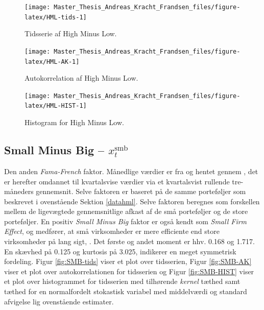 \documentclass[
  a4paper,
  oneside]{memoir}
\begin{document}
\begin{figure}[H]

{\centering \texttt{[image: Master\_Thesis\_Andreas\_Kracht\_Frandsen\_files/figure-latex/HML-tids-1]} 

}

\caption{Tidsserie af High Minus Low.}\label{fig:HML-tids}
\end{figure}

\begin{figure}[H]

{\centering \texttt{[image: Master\_Thesis\_Andreas\_Kracht\_Frandsen\_files/figure-latex/HML-AK-1]} 

}

\caption{Autokorrelation af High Minus Low.}\label{fig:HML-AK}
\end{figure}

\begin{figure}[H]

{\centering \texttt{[image: Master\_Thesis\_Andreas\_Kracht\_Frandsen\_files/figure-latex/HML-HIST-1]} 

}

\caption{Histogram for High Minus Low.}\label{fig:HML-HIST}
\end{figure}

\hypertarget{datasmb}{%
\subsection{\texorpdfstring{Small Minus Big -- \(x_t^{\text{smb}}\)}{Small Minus Big -- x\_t\^{}\{\textbackslash text\{smb\}\}}}\label{datasmb}}

Den anden \emph{Fama-French} faktor. Månedlige værdier er fra \citep{CRSPakt} og hentet gennem \citep{French2020}, det er herefter omdannet til kvartalsvise værdier via et kvartalsvist rullende tre-måneders gennemsnit. Selve faktoren er baseret på de samme porteføljer som beskrevet i ovenstående Sektion \ref{datahml}. Selve faktoren beregnes som forskellen mellem de ligevægtede gennemsnitlige afkast af de små porteføljer og de store porteføljer. En positiv \emph{Small Minus Big} faktor er også kendt som \emph{Small Firm Effect}, og medfører, at små virksomheder er mere efficiente end store virksomheder på lang sigt, \citep{French1993}. Det første og andet moment er hhv. 0.168 og 1.717. En skævhed på 0.125 og kurtosis på 3.025, indikerer en meget symmetrisk fordeling. Figur \ref{fig:SMB-tids} viser et plot over tidsserien, Figur \ref{fig:SMB-AK} viser et plot over autokorrelationen for tidsserien og Figur \ref{fig:SMB-HIST} viser et plot over histogrammet for tidsserien med tilhørende \emph{kernel} tæthed samt tæthed for en normalfordelt stokastisk variabel med middelværdi og standard afvigelse lig ovenstående estimater.
\end{document}
